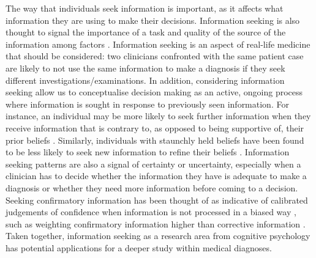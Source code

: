 \documentclass[a4paper, nobind]{templates/ociamthesis}
\begin{document}
The way that individuals seek information is important, as it affects what information they are using to make their decisions. Information seeking is also thought to signal the importance of a task and quality of the source of the information among factors \autocite{xu_who_2006}. Information seeking is an aspect of real-life medicine that should be considered: two clinicians confronted with the same patient case are likely to not use the same information to make a diagnosis if they seek different investigations/examinations. In addition, considering information seeking allow us to conceptualise decision making as an active, ongoing process where information is sought in response to previously seen information. For instance, an individual may be more likely to seek further information when they receive information that is contrary to, as opposed to being supportive of, their prior beliefs \autocite{adams_reduction_1961}. Similarly, individuals with staunchly held beliefs have been found to be less likely to seek new information to refine their beliefs \autocite{schulz_dogmatism_2020}. Information seeking patterns are also a signal of certainty or uncertainty, especially when a clinician has to decide whether the information they have is adequate \autocite{gehlbach_illusion_2024} to make a diagnosis or whether they need more information before coming to a decision. Seeking confirmatory information has been thought of as indicative of calibrated judgements of confidence when information is not processed in a biased way \autocite{rollwage_confidence_2020}, such as weighting confirmatory information higher than corrective information \autocite{schulz-hardt_biased_2000}. Taken together, information seeking as a research area from cognitive psychology has potential applications for a deeper study within medical diagnoses.\\
\end{document}
